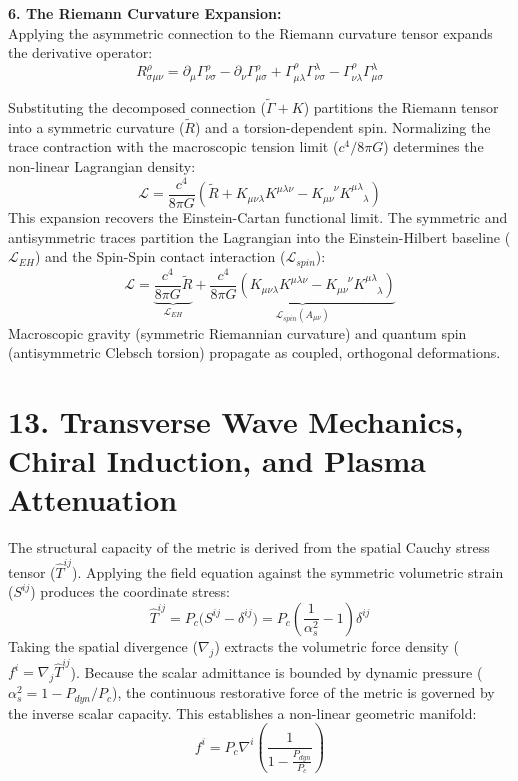 \textbf{6. The Riemann Curvature Expansion:} \\ 
Applying the asymmetric connection to the Riemann curvature tensor expands the derivative operator:
\begin{equation}
    R^\rho_{\sigma\mu\nu} = \partial_\mu \Gamma^\rho_{\nu\sigma} - \partial_\nu \Gamma^\rho_{\mu\sigma} + \Gamma^\rho_{\mu\lambda} \Gamma^\lambda_{\nu\sigma} - \Gamma^\rho_{\nu\lambda} \Gamma^\lambda_{\mu\sigma}
\end{equation}

Substituting the decomposed connection ($\tilde{\Gamma} + K$) partitions the Riemann tensor into a symmetric curvature ($\tilde{R}$) and a torsion-dependent spin. Normalizing the trace contraction with the macroscopic tension limit ($c^4/8\pi G$) determines the non-linear Lagrangian density: 
\begin{equation}
    \mathcal{L} = \frac{c^4}{8\pi G} \left( \tilde{R} + K_{\mu\nu\lambda} K^{\mu\lambda\nu} - K_{\mu\nu}^{\phantom{\mu\nu}\nu} K^{\mu\lambda}_{\phantom{\mu\lambda}\lambda} \right)
\end{equation}
This expansion recovers the Einstein-Cartan functional limit. The symmetric and antisymmetric traces partition the Lagrangian into the Einstein-Hilbert baseline ($\mathcal{L}_{EH}$) and the Spin-Spin contact interaction ($\mathcal{L}_{spin}$): 
\begin{equation}
    \mathcal{L} = \underbrace{\frac{c^4}{8\pi G} \tilde{R}}_{\mathcal{L}_{EH}} + \underbrace{\frac{c^4}{8\pi G} \left( K_{\mu\nu\lambda} K^{\mu\lambda\nu} - K_{\mu\nu}^{\phantom{\mu\nu}\nu} K^{\mu\lambda}_{\phantom{\mu\lambda}\lambda} \right)}_{\mathcal{L}_{spin}(A_{\mu\nu})} 
\end{equation}
Macroscopic gravity (symmetric Riemannian curvature) and quantum spin (antisymmetric Clebsch torsion) propagate as coupled, orthogonal deformations.

\section*{13. Transverse Wave Mechanics, Chiral Induction, and Plasma Attenuation} 
The structural capacity of the metric is derived from the spatial Cauchy stress tensor ($\hat{T}^{ij}$). Applying the field equation against the symmetric volumetric strain ($S^{ij}$) produces the coordinate stress:
\begin{equation}
    \hat{T}^{ij} = P_c \Big( S^{ij} - \delta^{ij} \Big) = P_c \left( \frac{1}{\alpha_s^2} - 1 \right)\delta^{ij}
\end{equation}
Taking the spatial divergence ($\nabla_j$) extracts the volumetric force density ($f^i = \nabla_j \hat{T}^{ij}$).  Because the scalar admittance is bounded by dynamic pressure ($\alpha_s^2 = 1 - P_{dyn}/P_c$), the continuous restorative force of the metric is governed by the inverse scalar capacity. This establishes a non-linear geometric manifold: 
\begin{equation}
    f^i = P_c \nabla^i \left( \frac{1}{1 - \frac{P_{dyn}}{P_c}} \right) \label{eq:nonlinear_restorative_force}
\end{equation}

